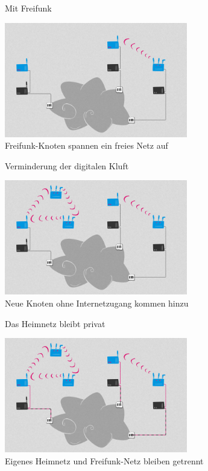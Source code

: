 \documentclass[10pt]{beamer}
\begin{document}
  \begin{frame}{Mit Freifunk}
    \begin{center}
      \includegraphics[height=5cm]{images/network_2}\\
      \vspace{1em}
      Freifunk-Knoten spannen ein freies Netz auf
      \vspace{1em}
    \end{center}
  \end{frame}

  \begin{frame}{Verminderung der digitalen Kluft}
    \begin{center}
      \includegraphics[height=5cm]{images/network_3}\\
      \vspace{1em}
      Neue Knoten ohne Internetzugang kommen hinzu
      \vspace{1em}
    \end{center}
  \end{frame}

  \begin{frame}{Das Heimnetz bleibt privat}
    \begin{center}
      \includegraphics[height=5cm]{images/network_4}\\
      \vspace{1em}
      Eigenes Heimnetz und Freifunk-Netz bleiben getrennt
      \vspace{1em}
    \end{center}
  \end{frame}
\end{document}
